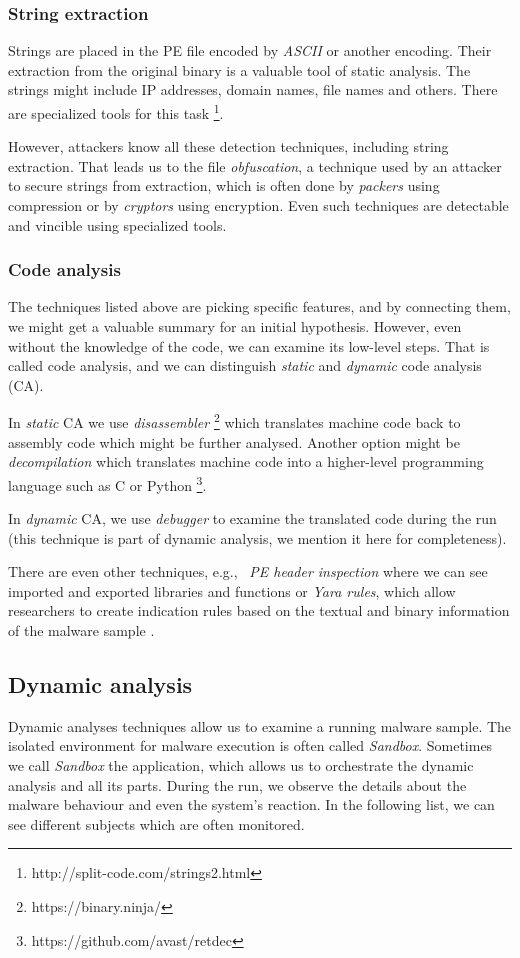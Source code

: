 \subsubsection*{String extraction}
Strings are placed in the PE file encoded by \emph{ASCII} or another encoding. Their extraction from the original binary is a valuable tool of static analysis. The strings might include IP addresses, domain names, file names and others. There are specialized tools for this task \footnote{http://split-code.com/strings2.html}. 

However, attackers know all these detection techniques, including string extraction. That leads us to the file \emph{obfuscation}, a technique used by an attacker to secure strings from extraction, which is often done by \emph{packers} using compression or by \emph{cryptors} using encryption. Even such techniques are detectable and vincible using specialized tools.

\subsubsection*{Code analysis}
The techniques listed above are picking specific features, and by connecting them, we might get a valuable summary for an initial hypothesis. 
However, even without the knowledge of the code, we can examine its low-level steps. That is called code analysis, and we can distinguish \emph{static} and \emph{dynamic} code analysis (CA).

In \emph{static} CA we use \emph{disassembler} \footnote{https://binary.ninja/} which translates machine code back to assembly code which might be further analysed. Another option might be \emph{decompilation} which translates machine code into a higher-level programming language such as C or Python \footnote{https://github.com/avast/retdec}.

In \emph{dynamic} CA, we use \emph{debugger} to examine the translated code during the run \cite{KA2018} (this technique is part of dynamic analysis, we mention it here for completeness).

\hfill \break
There are even other techniques, e.g., \ \emph{PE header inspection} where we can see imported and exported libraries and functions \cite{Sikorski2012} or \emph{Yara rules}, which allow researchers to create indication rules based on the textual and binary information of the malware sample \cite{KA2018}.

\subsection{Dynamic analysis}
Dynamic analyses techniques allow us to examine a running malware sample. The isolated environment for malware execution is often called \emph{Sandbox}. Sometimes we call \emph{Sandbox} the application, which allows us to orchestrate the dynamic analysis and all its parts. During the run, we observe the details about the malware behaviour and even the system's reaction. In the following list, we can see different subjects which are often monitored.

